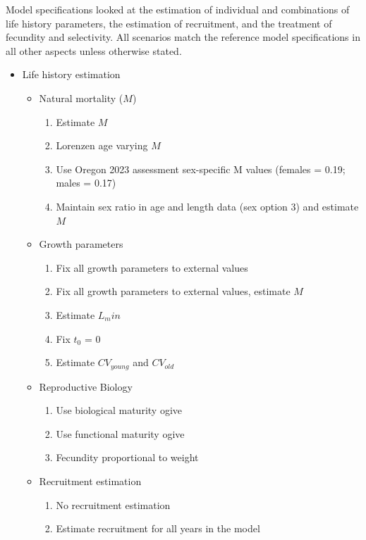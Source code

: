 \documentclass[
]{scrartcl}
\providecommand{\tightlist}{%
  \setlength{\itemsep}{0pt}\setlength{\parskip}{0pt}}\usepackage{longtable,booktabs,array}
\begin{document}
Model specifications looked at the estimation of individual and
combinations of life history parameters, the estimation of recruitment,
and the treatment of fecundity and selectivity. All scenarios match the
reference model specifications in all other aspects unless otherwise
stated.

\begin{itemize}
\tightlist
\item
  Life history estimation

  \begin{itemize}
  \tightlist
  \item
    Natural mortality (\(M\))

    \begin{enumerate}
    \def\labelenumi{\arabic{enumi}.}
    \tightlist
    \item
      Estimate \(M\)
    \item
      Lorenzen age varying \(M\)
    \item
      Use Oregon 2023 assessment sex-specific M values (females = 0.19;
      males = 0.17)
    \item
      Maintain sex ratio in age and length data (sex option 3) and
      estimate \(M\)
    \end{enumerate}
  \item
    Growth parameters

    \begin{enumerate}
    \def\labelenumi{\arabic{enumi}.}
    \setcounter{enumi}{5}
    \tightlist
    \item
      Fix all growth parameters to external values
    \item
      Fix all growth parameters to external values, estimate \(M\)
    \item
      Estimate \(L_min\)
    \item
      Fix \(t_0\) = 0
    \item
      Estimate \(CV_{young}\) and \(CV_{old}\)
    \end{enumerate}
  \item
    Reproductive Biology

    \begin{enumerate}
    \def\labelenumi{\arabic{enumi}.}
    \setcounter{enumi}{9}
    \tightlist
    \item
      Use biological maturity ogive
    \item
      Use functional maturity ogive
    \item
      Fecundity proportional to weight
    \end{enumerate}
  \item
    Recruitment estimation

    \begin{enumerate}
    \def\labelenumi{\arabic{enumi}.}
    \setcounter{enumi}{12}
    \tightlist
    \item
      No recruitment estimation
    \item
      Estimate recruitment for all years in the model
    \end{enumerate}
  \end{itemize}
\end{itemize}
\end{document}
